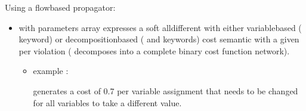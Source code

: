 \documentclass[letterpaper,10pt,openany,oneside,english]{sphinxmanual}
\begin{document}
\sphinxAtStartPar
Using a flow\sphinxhyphen{}based propagator:
\begin{itemize}
\item {} 
\sphinxAtStartPar
{} with parameters array  expresses a soft alldifferent with either variable\sphinxhyphen{}based ( keyword) or decomposition\sphinxhyphen{}based ( and  keywords) cost semantic with a given  per violation ( decomposes into a complete binary cost function network).
\begin{itemize}
\item {} 
\sphinxAtStartPar
example :

\begin{sphinxVerbatim}[commandchars=\\\{\}]
  \PYG{p}{[}   \PYG{p}{]}
        
           
\end{sphinxVerbatim}

\sphinxAtStartPar
generates a cost of 0.7 per variable assignment that needs to be
changed for all variables to take a different value.

\end{itemize}


\end{itemize}
\end{document}
